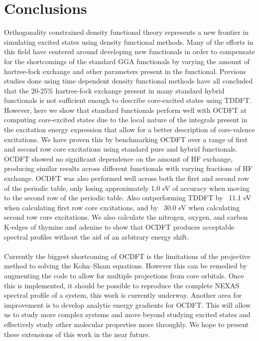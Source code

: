 \documentclass[11.5pt]{article}
\begin{document}
\section{Conclusions}
Orthogonality constrained density functional theory represents a new frontier in simulating excited states using density functional methods. Many of the efforts in this field have centered around developing new functionals in order to compensate for the shortcomings of the standard GGA functionals by varying the amount of hartree-fock exchange and other parameters present in the functional. Previous studies done using time dependent density functional methods have all concluded that the 20-25\% hartree-fock exchange present in many standard hybrid functionals is not sufficient enough to describe core-excited states using TDDFT. However, here we show that standard functionals perform well with OCDFT at computing core-excited states due to the local nature of the integrals present in the excitation energy expression that allow for a better description of core-valence excitations. We have proven this by benchmarking OCDFT over a range of first and second row core excitations using standard pure and hybrid functionals. OCDFT showed no significant dependence on the amount of HF exchange, producing similar results across different functionals with varying fractions of HF exchange. OCDFT was also performed well across both the first and second row of the periodic table, only losing approximately 1.0 eV of accuracy when moving to the second row of the periodic table. Also outperforming TDDFT by ~11.1 eV when calculating first row core excitations, and by ~30.0 eV when calculating second row core excitations. We also calculate the nitrogen, oxygen, and carbon K-edges of thymine and adenine to show that OCDFT produces acceptable spectral profiles without the aid of an arbitrary energy shift.
\\ \\ 
Currently the biggest shortcoming of OCDFT is the limitations of the projective method to solving the Kohn--Sham equations. However this can be remedied by augmenting the code to allow for multiple projections from core orbitals. Once this is implemented, it should be possible to reproduce the complete NEXAS spectral profile of a system, this work is currently underway. Another area for improvement is to develop analytic energy gradients for OCDFT. This will allow us to study more complex systems and move beyond studying excited states and effectively study other molecular properties more throughly. We hope to present these extensions of this work in the near future.
\footnotesize{
}
\end{document}
